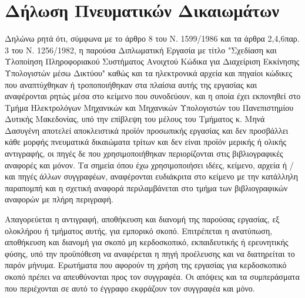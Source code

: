 \chapter*{Δήλωση Πνευματικών Δικαιωμάτων}
Δηλώνω ρητά ότι, σύμφωνα με το άρθρο 8 του Ν. 1599/1986 και τα άρθρα 2,4,6παρ. 3 του Ν. 1256/1982, η παρούσα Διπλωματική Εργασία με τίτλο "Σχεδίαση και Υλοποίηση Πληροφοριακού Συστήματος Ανοιχτού Κώδικα για Διαχείριση Εκκίνησης Υπολογιστών μέσω Δικτύου" καθώς και τα ηλεκτρονικά αρχεία και πηγαίοι κώδικες που αναπτύχθηκαν ή τροποποιήθηκαν στα πλαίσια αυτής της εργασίας και αναφέρονται ρητώς μέσα στο κείμενο που συνοδεύουν, και η οποία έχει εκπονηθεί στο Τμήμα Ηλεκτρολόγων Μηχανικών και Μηχανικών Υπολογιστών του Πανεπιστημίου Δυτικής Μακεδονίας, υπό την επίβλεψη του μέλους του Τμήματος κ. Μηνά Δασυγένη αποτελεί αποκλειστικά προϊόν προσωπικής εργασίας και δεν προσβάλλει κάθε μορφής πνευματικά δικαιώματα τρίτων και δεν είναι προϊόν μερικής ή ολικής αντιγραφής, οι πηγές δε που χρησιμοποιήθηκαν περιορίζονται στις βιβλιογραφικές αναφορές και μόνον. Τα σημεία όπου έχω χρησιμοποιήσει ιδέες, κείμενο, αρχεία ή / και πηγές άλλων συγγραφέων, αναφέρονται ευδιάκριτα στο κείμενο με την κατάλληλη παραπομπή και η σχετική αναφορά περιλαμβάνεται στο τμήμα των βιβλιογραφικών αναφορών με πλήρη περιγραφή.

Απαγορεύεται η αντιγραφή, αποθήκευση και διανομή της παρούσας εργασίας, εξ ολοκλήρου ή τμήματος αυτής, για εμπορικό σκοπό. Επιτρέπεται η ανατύπωση, αποθήκευση και διανομή για σκοπό μη κερδοσκοπικό, εκπαιδευτικής ή ερευνητικής φύσης, υπό την προϋπόθεση να αναφέρεται η πηγή προέλευσης και να διατηρείται το παρόν μήνυμα. Ερωτήματα που αφορούν τη
χρήση της εργασίας για κερδοσκοπικό σκοπό πρέπει να απευθύνονται προς τον συγγραφέα. Οι απόψεις και τα συμπεράσματα που περιέχονται σε αυτό το έγγραφο εκφράζουν τον συγγραφέα και μόνο.

\vfill

\begin{center}
\end{center}